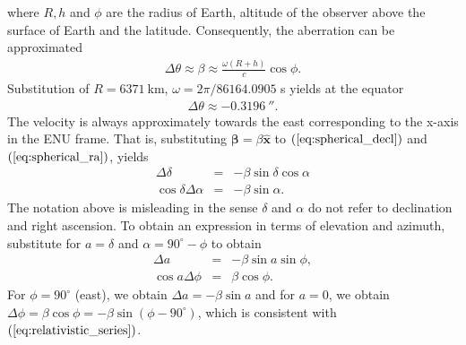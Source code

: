 \documentclass [12pt, a4paper] {article}
\newcommand{\vu}[1]
{
	\mathbf{\hat #1}
}
\newcommand{\vc}[1]
{
	\boldsymbol{#1}
}
\begin{document}
where $R, h$ and $\phi$ are the radius of Earth, altitude of the observer 
above the surface of Earth and the latitude. Consequently, the aberration 
can be approximated
\begin {eqnarray}
    \Delta\theta \approx \beta \approx \frac{\omega(R + h)}{c}\cos\phi.
\end {eqnarray}
Substitution of $R= 6371\:$km, $\omega = 2\pi/86164.0905$ s yields at the 
equator
\begin {eqnarray}
    \Delta\theta \approx -\SI{0.3196}{\arcsecond}.
\end {eqnarray}
The velocity is always approximately towards the east corresponding to the 
x-axis in the ENU frame. That is, substituting $\vc\beta=\beta\vu x$ to 
$(\ref{eq:spherical_decl})$ and $(\ref{eq:spherical_ra})$, yields 
\begin {eqnarray}
    \Delta\delta &=& - \beta\sin\delta\cos\alpha 
    \\
    \cos\delta\Delta\alpha &=& - \beta\sin\alpha.
\end {eqnarray}
The notation above is misleading in the sense $\delta$ and $\alpha$ do not 
refer to declination and right ascension. To obtain an expression in terms 
of elevation and azimuth, substitute for $a = \delta$ and 
$\alpha = 90^\circ - \phi$ to obtain 
\begin {eqnarray}
    \Delta a &=& -\beta\sin a\sin\phi, \\
    \cos a\Delta\phi &=& \beta\cos\phi.
\end {eqnarray}
For $\phi = 90^\circ$ (east), we obtain $\Delta a = -\beta\sin a$ and for 
$a = 0$, we obtain $\Delta\phi = \beta\cos\phi = -\beta\sin (\phi - 90^\circ)$, 
which is consistent with $(\ref{eq:relativistic_series})$.
\end{document}
